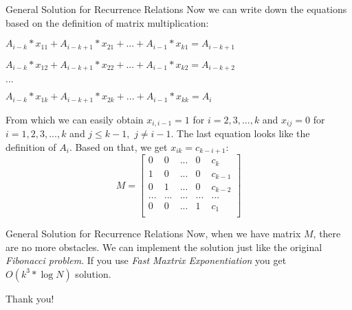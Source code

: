 \documentclass{beamer}
\begin{document}
\begin{frame}{General Solution for Recurrence Relations}
  Now we can write down the equations based on the definition of matrix multiplication:
  \pause \newline
  \centerline{$A_{i-k}*x_{11} + A_{i-k+1}*x_{21} + ... + A_{i-1}*x_{k1} = A_{i-k+1}$}
  \newline
  \centerline{$A_{i-k}*x_{12} + A_{i-k+1}*x_{22} + ... + A_{i-1}*x_{k2} = A_{i-k+2}$}
  \newline
  \centerline{$...$}
  \newline
  \centerline{$A_{i-k}*x_{1k} + A_{i-k+1}*x_{2k} + ... + A_{i-1}*x_{kk} = A_{i}$}
  \pause \newline\newline
  From which we can easily obtain $x_{i,i-1} = 1$ for $i = 2, 3, ..., k$ and 
  $x_{ij} = 0$ for $i = 1, 2, 3, ..., k$ and $j \leq k - 1,$ $j \neq i - 1$.
  \pause \newline
  The last equation looks like the definition of $A_i$. Based on that, we get $x_{ik} = c_{k-i+1}$:
  \[
    M = 
    \left[ {
      \begin{array}{ccccc}
        0 & 0 & ... & 0 & c_k \\
        1 & 0 & ... & 0 & c_{k-1} \\
        0 & 1 & ... & 0 & c_{k-2} \\
        ... & ... & ... & ... & ... \\
        0 & 0 & ... & 1 & c_1 \\
      \end{array} } 
    \right]
  \]
\end{frame}

\begin{frame}{General Solution for Recurrence Relations}
  Now, when we have matrix $M$, there are no more obstacles. 
  \newline
  We can implement the solution just like the original \textit{Fibonacci problem}.
  \pause \newline\newline
  If you use \textit{Fast Maxtrix Exponentiation} you get $O(k^3 * \log{N})$ solution.
\end{frame}

\begin{frame}{}
                \LARGE{\centerline{Thank you!}}
\end{frame}
\end{document}
